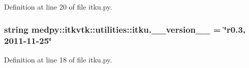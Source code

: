Definition at line 20 of file itku.py.

\hypertarget{namespacemedpy_1_1itkvtk_1_1utilities_1_1itku_a7742f169b102cb0623776cacb7bef1a7}{
\subsubsection[{\_\-\_\-version\_\-\_\-}]{\setlength{\rightskip}{0pt plus 5cm}string {\bf medpy::itkvtk::utilities::itku.\_\-\_\-version\_\-\_\-} = \char`\"{}r0.3, 2011-\/11-\/25\char`\"{}}}
\label{namespacemedpy_1_1itkvtk_1_1utilities_1_1itku_a7742f169b102cb0623776cacb7bef1a7}


Definition at line 18 of file itku.py.

